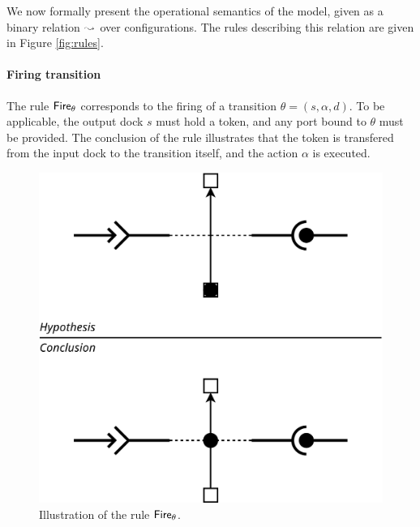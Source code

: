 
    
We now formally present the operational semantics of the \mad model,
given as a binary relation $\leadsto$ over configurations. The rules
describing this relation are given in Figure \ref{fig:rules}.

\paragraph{Firing transition}{

The rule $\mathsf{Fire}_\theta$ corresponds to the firing of a transition
$\theta = (s, \alpha, d)$. To be applicable, the output dock $s$ must
hold a token, and any port bound to $\theta$ must be provided. The
conclusion of the rule illustrates that the token is transfered from
the input dock to the transition itself, and the action $\alpha$ is
executed.

\begin{figure}[t]
\begin{center}
  \includegraphics[width=0.55\columnwidth]{./images/firing.pdf}
\end{center}
\caption{Illustration of the rule $\mathsf{Fire}_\theta$.}
\label{fig:r1}
\end{figure}

}

